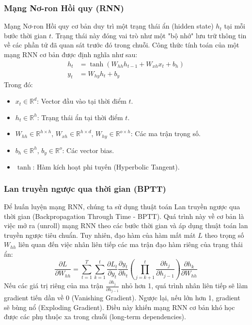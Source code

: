\documentclass[12pt,a4paper]{article}
\begin{document}
\subsubsection{Mạng Nơ-ron Hồi quy (RNN)}
Mạng Nơ-ron Hồi quy cơ bản duy trì một trạng thái ẩn (hidden state) $h_t$ tại mỗi bước thời gian $t$. Trạng thái này đóng vai trò như một "bộ nhớ" lưu trữ thông tin về các phần tử đã quan sát trước đó trong chuỗi.
Công thức tính toán của một mạng RNN cơ bản được định nghĩa như sau:
\begin{align}
    h_t &= \tanh(W_{hh} h_{t-1} + W_{xh} x_t + b_h) \\
    y_t &= W_{hy} h_t + b_y
\end{align}
Trong đó:
\begin{itemize}
    \item $x_t \in \mathbb{R}^d$: Vector đầu vào tại thời điểm $t$.
    \item $h_t \in \mathbb{R}^h$: Trạng thái ẩn tại thời điểm $t$.
    \item $W_{hh} \in \mathbb{R}^{h \times h}$, $W_{xh} \in \mathbb{R}^{h \times d}$, $W_{hy} \in \mathbb{R}^{o \times h}$: Các ma trận trọng số.
    \item $b_h \in \mathbb{R}^h$, $b_y \in \mathbb{R}^o$: Các vector bias.
    \item $\tanh$: Hàm kích hoạt phi tuyến (Hyperbolic Tangent).
\end{itemize}

\subsubsection{Lan truyền ngược qua thời gian (BPTT)}
Để huấn luyện mạng RNN, chúng ta sử dụng thuật toán Lan truyền ngược qua thời gian (Backpropagation Through Time - BPTT). Quá trình này về cơ bản là việc mở ra (unroll) mạng RNN theo các bước thời gian và áp dụng thuật toán lan truyền ngược tiêu chuẩn. Tuy nhiên, đạo hàm của hàm mất mát $L$ theo trọng số $W_{hh}$ liên quan đến việc nhân liên tiếp các ma trận đạo hàm riêng của trạng thái ẩn:
\begin{equation}
    \frac{\partial L}{\partial W_{hh}} = \sum_{t=1}^T \sum_{k=1}^t \frac{\partial L_t}{\partial y_t} \frac{\partial y_t}{\partial h_t} \left( \prod_{j=k+1}^t \frac{\partial h_j}{\partial h_{j-1}} \right) \frac{\partial h_k}{\partial W_{hh}}
\end{equation}
Nếu các giá trị riêng của ma trận $\frac{\partial h_j}{\partial h_{j-1}}$ nhỏ hơn 1, quá trình nhân liên tiếp sẽ làm gradient tiến dần về 0 (Vanishing Gradient). Ngược lại, nếu lớn hơn 1, gradient sẽ bùng nổ (Exploding Gradient). Điều này khiến mạng RNN cơ bản khó học được các phụ thuộc xa trong chuỗi (long-term dependencies).
\end{document}
